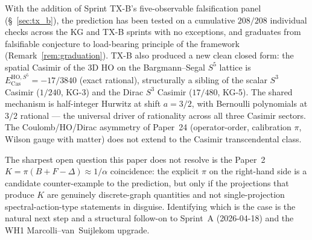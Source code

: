 \documentclass[11pt]{article}
\begin{document}
With the addition of Sprint TX-B's five-observable falsification
panel (\S~\ref{sec:tx_b}), the prediction has been tested on a
cumulative $208/208$ individual checks across the KG and TX-B
sprints with no exceptions, and graduates from falsifiable conjecture
to load-bearing principle of the framework
(Remark~\ref{rem:graduation}).  TX-B also produced a new clean
closed form: the spatial Casimir of the 3D HO on the Bargmann--Segal
$S^5$ lattice is $E_\text{Cas}^{\text{HO}, S^5} = -17/3840$ (exact
rational), structurally a sibling of the scalar $S^3$ Casimir
($1/240$, KG-3) and the Dirac $S^3$ Casimir ($17/480$, KG-5).
The shared mechanism is half-integer Hurwitz at shift $a = 3/2$, with
Bernoulli polynomials at $3/2$ rational --- the universal driver of
rationality across all three Casimir sectors.  The Coulomb/HO/Dirac
asymmetry of Paper~24 (operator-order, calibration $\pi$, Wilson
gauge with matter) does not extend to the Casimir transcendental
class.

The sharpest open question this paper does not resolve is the Paper~2
$K = \pi(B + F - \Delta) \approx 1/\alpha$ coincidence: the explicit
$\pi$ on the right-hand side is a candidate counter-example to the
prediction, but only if the projections that produce $K$ are genuinely
discrete-graph quantities and not single-projection
spectral-action-type statements in disguise.  Identifying which is the
case is the natural next step and a structural follow-on to Sprint~A
(2026-04-18) and the WH1 Marcolli--van~Suijlekom upgrade.
\end{document}
